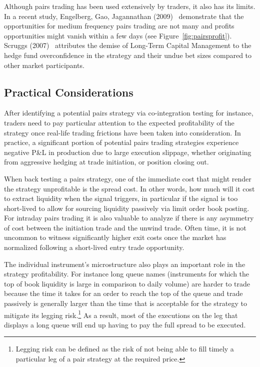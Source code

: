 Although pairs trading has been used extensively by traders, it also has its limits. In a recent study, Engelberg, Gao, Jagannathan (2009)~\cite{engelberg2009anatomy} demonstrate that the opportunities for medium frequency pairs trading are not many and profits opportunities might vanish within a few days (see Figure~\ref{fig:pairsprofit}). Scruggs (2007)~\cite{scruggs} attributes the demise of Long-Term Capital Management to the hedge fund overconfidence in the strategy and their undue bet sizes compared to other market participants.


\subsection{Practical Considerations \label{s:pract_consid}}

After identifying a potential pairs strategy via co-integration testing for instance, traders need to pay particular attention to the expected profitability of the strategy once real-life trading frictions have been taken into consideration. In practice, a significant portion of potential pairs trading strategies experience negative P\&L in production due to large execution slippage, whether originating from aggressive hedging at trade initiation, or position closing out.


When back testing a pairs strategy, one of the immediate cost that might render the strategy unprofitable is the spread cost. In other words, how much will it cost to extract liquidity when the signal triggers, in particular if the signal is too short-lived to allow for sourcing liquidity passively via limit order book posting. For intraday pairs trading it is also valuable to analyze if there is any asymmetry of cost between the initiation trade and the unwind trade. Often time, it is not uncommon to witness significantly higher exit costs once the market has normalized following a short-lived entry trade opportunity. 


The individual instrument's microstructure also plays an important role in the strategy profitability. For instance long queue names  (instruments for which the top of book liquidity is large in comparison to daily volume)  are harder to trade because the time it takes for an order to reach the top of the queue and trade passively is generally larger than the time that is acceptable for the strategy to mitigate its legging risk.\footnote{Legging risk can be defined as the risk of not being able to fill timely a particular leg of a pair strategy at the required price.} As a result, most of the executions on the leg that displays a long queue will end up having to pay the full spread to be executed. 


